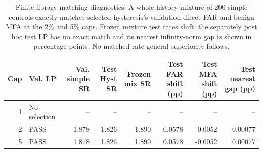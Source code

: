 \begin{table}[!htbp]
\centering
\caption{Finite-library matching diagnostics. A whole-history mixture of 200 simple controls exactly matches selected hysteresis's validation direct FAR and benign MFA at the 2\% and 5\% caps. Frozen mixture test rates shift; the separately post hoc test LP has no exact match and its nearest infinity-norm gap is shown in percentage points. No matched-rate general superiority follows.}
\label{tab:supp_matching}
\scriptsize
\setlength{\tabcolsep}{3pt}
\begin{tabular}{rlrrrrrr}
\toprule
Cap & Val. LP & Val. simple SR & Test Hyst SR & Frozen mix SR & Test FAR shift (pp) & Test MFA shift (pp) & Test nearest gap (pp)\\
\midrule
1 & No selection & -- & -- & -- & -- & -- & -- \\
2 & PASS & 1.878 & 1.826 & 1.890 & 0.0578 & -0.0052 & 0.00077 \\
5 & PASS & 1.878 & 1.826 & 1.890 & 0.0578 & -0.0052 & 0.00077 \\
\bottomrule
\end{tabular}
\end{table}
